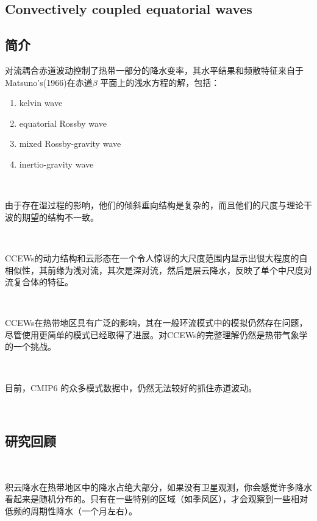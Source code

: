 \documentclass{article}
\begin{document}
\begin{CJK*}{UTF8}{gbsn}

\section*{Convectively coupled equatorial waves}

\subsection*{简介}


对流耦合赤道波动控制了热带一部分的降水变率，其水平结果和频散特征来自于Matsuno's(1966)在赤道$\beta$ 平面上的浅水方程的解，包括：
\begin{enumerate}
    \item 
    kelvin wave
    \item
    equatorial Rossby wave
    \item
    mixed Rossby-gravity  wave
    \item
    inertio-gravity wave
\end{enumerate}

\

由于存在湿过程的影响，他们的倾斜垂向结构是复杂的，而且他们的尺度与理论干波的期望的结构不一致。

\

CCEWs的动力结构和云形态在一个令人惊讶的大尺度范围内显示出很大程度的自相似性，其前缘为浅对流，其次是深对流，然后是层云降水，反映了单个中尺度对流复合体的特征。

\

CCEWs在热带地区具有广泛的影响，其在一般环流模式中的模拟仍然存在问题，尽管使用更简单的模式已经取得了进展。对CCEWs的完整理解仍然是热带气象学的一个挑战。

\

目前，CMIP6 的众多模式数据中，仍然无法较好的抓住赤道波动。

\

\subsection*{ 研究回顾}

\

积云降水在热带地区中的降水占绝大部分，如果没有卫星观测，你会感觉许多降水看起来是随机分布的。只有在一些特别的区域（如季风区），才会观察到一些相对低频的周期性降水（一个月左右）。

\ 


\end{CJK*}
\end{document}
